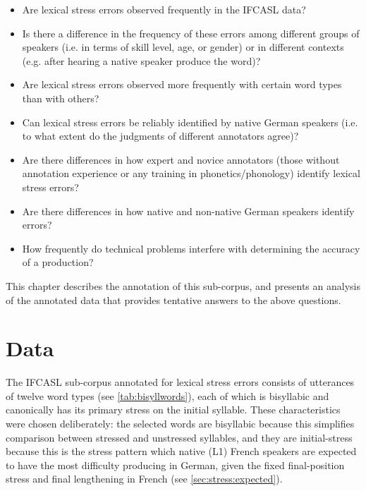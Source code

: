	\begin{itemize}
	\item{Are lexical stress errors observed frequently in the IFCASL data?}
	\item{Is there a difference in the frequency of these errors among different groups of speakers (i.e. in terms of skill level, age, or gender) or in different contexts (e.g. after hearing a native speaker produce the word)?}
	\item{Are lexical stress errors observed more frequently with certain word types than with others?}
	\item{Can lexical stress errors be reliably identified by native German speakers (i.e. to what extent do the judgments of different annotators agree)?}
	\item{Are there differences in how expert and novice annotators (those without annotation experience or any training in phonetics/phonology) identify lexical stress errors?} 
	\item{Are there differences in how native and non-native German speakers identify errors?}
	\item{How frequently do technical problems interfere with determining the accuracy of a production?}
	\end{itemize}
	
	This chapter describes the annotation of this sub-corpus, and presents an analysis of the annotated data that provides tentative answers to the above questions. 
	
	\section{Data}
	\label{sec:lexstress:data}
	
	The IFCASL sub-corpus annotated for lexical stress errors consists of utterances of twelve word types (see \cref{tab:bisyllwords}), each of which is bisyllabic and canonically has its primary stress on the initial syllable. These characteristics were chosen deliberately: the selected words are bisyllabic because this simplifies comparison between stressed and unstressed syllables, and they are initial-stress because this is the stress pattern which native (L1) French speakers are expected to have the most difficulty producing in German, given the fixed final-position stress and final lengthening in French (see \cref{sec:stress:expected}). 
	
